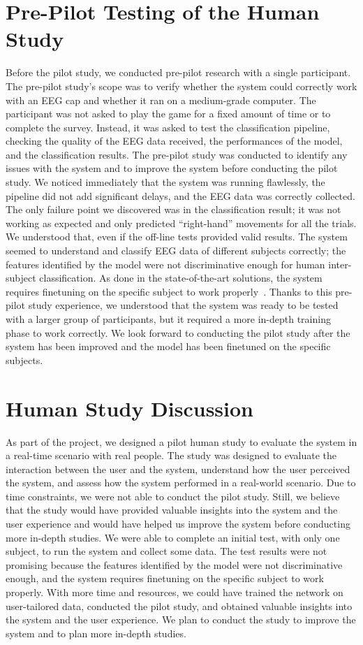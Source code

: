 \section{Pre-Pilot Testing of the Human Study}
Before the pilot study, we conducted pre-pilot research with a single participant.
The pre-pilot study's scope was to verify whether the system could correctly work with an EEG cap and whether it ran on a medium-grade computer.
The participant was not asked to play the game for a fixed amount of time or to complete the survey.
Instead, it was asked to test the classification pipeline, checking the quality of the EEG data received, the performances of the model, and the classification results.
The pre-pilot study was conducted to identify any issues with the system and to improve the system before conducting the pilot study.
We noticed immediately that the system was running flawlessly, the pipeline did not add significant delays, and the EEG data was correctly collected.
The only failure point we discovered was in the classification result; it was not working as expected and only predicted ``right-hand'' movements for all the trials.
We understood that, even if the off-line tests provided valid results. The system seemed to understand and classify EEG data of different subjects correctly; the features identified by the model were not discriminative enough for human inter-subject classification. As done in the state-of-the-art solutions, the system requires finetuning on the specific subject to work properly~\cite{jia2023excellent}.
Thanks to this pre-pilot study experience, we understood that the system was ready to be tested with a larger group of participants, but it required a more in-depth training phase to work correctly.
We look forward to conducting the pilot study after the system has been improved and the model has been finetuned on the specific subjects.

\section{Human Study Discussion}
As part of the project, we designed a pilot human study to evaluate the system in a real-time scenario with real people.
The study was designed to evaluate the interaction between the user and the system, understand how the user perceived the system, and assess how the system performed in a real-world scenario.
Due to time constraints, we were not able to conduct the pilot study. Still, we believe that the study would have provided valuable insights into the system and the user experience and would have helped us improve the system before conducting more in-depth studies.
We were able to complete an initial test, with only one subject, to run the system and collect some data.
The test results were not promising because the features identified by the model were not discriminative enough, and the system requires finetuning on the specific subject to work properly.
With more time and resources, we could have trained the network on user-tailored data, conducted the pilot study, and obtained valuable insights into the system and the user experience. We plan to conduct the study to improve the system and to plan more in-depth studies.